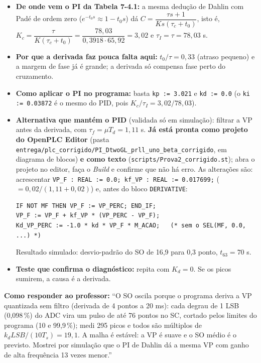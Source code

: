 \documentclass[11pt,a4paper]{article}
\begin{document}
\begin{itemize}
\item \textbf{De onde vem o PI da Tabela 7-4.1:} a mesma dedução de Dahlin com Padé de ordem zero ($e^{-t_0s}\approx1-t_0s$) dá $C=\dfrac{\tau s+1}{K s(\tau_c+t_0)}$, isto é, $K_c=\dfrac{\tau}{K(\tau_c+t_0)}=\dfrac{78{,}03}{0{,}3918\cdot65{,}92}=3{,}02$ e $\tau_I=\tau=78{,}03$ s.
\item \textbf{Por que a derivada faz pouca falta aqui:} $t_0/\tau=0{,}33$ (atraso pequeno) e a margem de fase já é grande; a derivada só compensa fase perto do cruzamento.
\item \textbf{Como aplicar o PI no programa:} basta \texttt{kp := 3.021} e \texttt{kd := 0.0} (o \texttt{ki := 0.03872} é o mesmo do PID, pois $K_c/\tau_I=3{,}02/78{,}03$).
\item \textbf{Alternativa que mantém o PID} (validada só em simulação): filtrar a VP antes da derivada, com $\tau_f=\mu T_d=1{,}11$ s. \textbf{Já está pronta como projeto do OpenPLC Editor} (pasta \texttt{entrega/plc\_corrigido/PI\_DtwoGL\_prll\_uno\_beta\_corrigido}, em diagrama de blocos) \textbf{e como texto} (\texttt{scripts/Prova2\_corrigido.st}); abra o projeto no editor, faça o \emph{Build} e confirme que não há erro. As alterações são: acrescentar \texttt{VP\_F : REAL := 0.0; kf\_VP : REAL := 0.017699;} ($=0{,}02/(1{,}11+0{,}02)$) e, antes do bloco \texttt{DERIVATIVE}:
\begin{lstlisting}
IF NOT MF THEN VP_F := VP_PERC; END_IF;
VP_F := VP_F + kf_VP * (VP_PERC - VP_F);
Kd_VP_PERC := -1.0 * kd * VP_F * M_ACAO;   (* sem o SEL(MF, 0.0, ...) *)
\end{lstlisting}
Resultado simulado: desvio-padrão do SO de 16,9 para 0,3 ponto, $t_{63}=70$ s.
\item \textbf{Teste que confirma o diagnóstico:} repita com $K_d=0$. Se os picos sumirem, a causa é a derivada.
\end{itemize}
\textbf{Como responder ao professor:} ``O SO oscila porque o programa deriva a VP quantizada sem filtro (derivada de 4 pontos a 20 ms): cada degrau de 1 LSB (0,098\,\%) do ADC vira um pulso de até 76 pontos no SC, cortado pelos limites do programa (10 e 99,9\,\%); medi 295 picos e todos são múltiplos de $k_dLSB/(10T_s)=19{,}1$. A malha é estável: a VP é suave e o SO médio é o previsto. Mostrei por simulação que o PI de Dahlin dá a mesma VP com ganho de alta frequência 13 vezes menor.''
\end{document}
